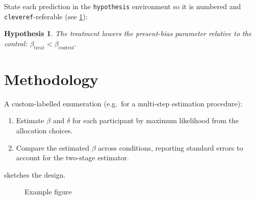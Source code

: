 \documentclass[
    fontsize=12pt,fleqn,
    letterpaper,oneside,paper=portrait,
]{scrartcl}
\newtheorem{hypothesis}{Hypothesis}
\newcommand{\textcitedash}[1]{%
  {%
  \DeclareDelimFormat{finalnamedelim}{\textendash}%
  \textcite{#1}%
  }%
}
\begin{document}
State each prediction in the \texttt{hypothesis} environment so it is numbered
and \texttt{cleveref}-referable (see \cref{hyp:main}):

\begin{hypothesis}\label{hyp:main}
The treatment lowers the present-bias parameter relative to the control:
$\beta_{\text{treat}} < \beta_{\text{control}}$.
\end{hypothesis}

\section{Methodology}\label{sec:method}

A custom-labelled enumeration (e.g.\ for a multi-step estimation procedure):

\begin{enumerate}[label=\textbf{\sffamily Step \arabic*:}, align=left, leftmargin=*]
    \item Estimate $\beta$ and $\delta$ for each participant by maximum
    likelihood from the allocation choices.
    \item Compare the estimated $\beta$ across conditions, reporting
    \textcitedash{RoeSmith2019} standard errors to account for the two-stage
    estimator.
\end{enumerate}

 sketches the design.

\begin{figure}\centering
  \caption{Example figure\label{fig:example}}
\end{figure}

%
% 

\vspace{1\baselineskip}

{\RaggedRight \printbibliography}
\end{document}
